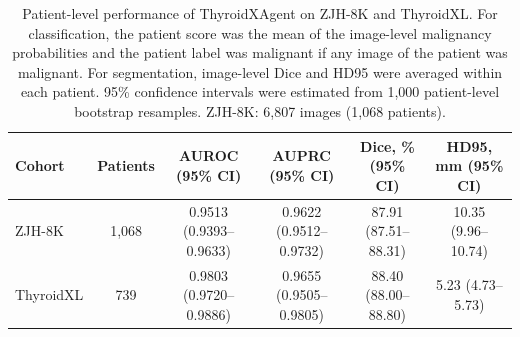 \begin{table}[p]
\centering
\begin{threeparttable}

\caption{Patient-level performance of ThyroidXAgent on ZJH-8K and ThyroidXL. For classification, the patient score was the mean of the image-level malignancy probabilities and the patient label was malignant if any image of the patient was malignant. For segmentation, image-level Dice and HD95 were averaged within each patient. 95\% confidence intervals were estimated from 1{,}000 patient-level bootstrap resamples. ZJH-8K: 6{,}807 images (1{,}068 patients).}
\label{tab:patient_level}

\footnotesize
\setlength{\tabcolsep}{5.5pt}
\renewcommand{\arraystretch}{1.08}

\begin{tabular}{lccccc}
\toprule
\textbf{Cohort} & \textbf{Patients} & \textbf{AUROC (95\% CI)} & \textbf{AUPRC (95\% CI)} & \textbf{Dice, \% (95\% CI)} & \textbf{HD95, mm (95\% CI)} \\
\midrule
ZJH-8K & 1,068 & 0.9513 (0.9393--0.9633) & 0.9622 (0.9512--0.9732) & 87.91 (87.51--88.31) & 10.35 (9.96--10.74) \\
ThyroidXL & 739 & 0.9803 (0.9720--0.9886) & 0.9655 (0.9505--0.9805) & 88.40 (88.00--88.80) & 5.23 (4.73--5.73) \\
\bottomrule
\end{tabular}
\end{threeparttable}
\end{table}
